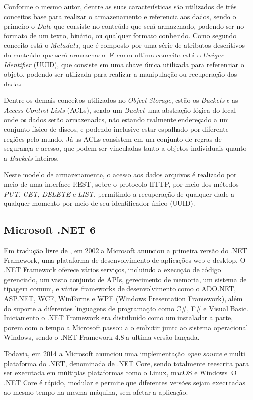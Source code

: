 Conforme o mesmo autor, dentre as suas características são utilizados de três
conceitos base para realizar o armazenamento e referencia aos dados, sendo
o primeiro o \emph{Data} que consiste no conteúdo que será armazenado,
podendo ser no formato de um texto, binário, ou qualquer formato conhecido.
Como segundo conceito está o \emph{Metadata}, que é composto por uma série de
atributos descritivos do conteúdo que será armazenado. E como ultimo conceito está
o \emph{Unique Identifier} (UUID), que consiste em uma chave única utilizada
para referenciar o objeto, podendo ser utilizada para realizar a manipulação ou
recuperação dos dados.

Dentre os demais conceitos utilizados no \emph{Object Storage}, estão os
\emph{Buckets} e as \emph{Access Control Lists} (ACLs), sendo um \emph{Bucket}
uma abstração lógica do local onde os dados serão armazenados, não estando
realmente endereçado a um conjunto físico de discos, e podendo inclusive
estar espalhado por diferente regiões pelo mundo. Já as ACLs consistem em
um conjunto de regras de segurança e acesso, que podem ser vinculadas
tanto a objetos individuais quanto a \emph{Buckets} inteiros.

Neste modelo de armazenamento, o acesso aos dados arquivos é realizado por meio
de uma interface REST, sobre o protocolo HTTP, por meio dos métodos \emph{PUT},
\emph{GET}, \emph{DELETE} e \emph{LIST}, permitindo a recuperação de qualquer
dado a qualquer momento por meio de seu identificador único (UUID).

\subsection{Microsoft .NET 6}

Em tradução livre de \cite{Akella:2022}, em 2002 a Microsoft anunciou a primeira
versão do .NET Framework, uma plataforma de desenvolvimento de aplicações
web e desktop. O .NET Framework oferece vários serviços, incluindo a
execução de código gerenciado, um vasto conjunto de APIs, gerecimento
de memoria, um sistema de tipagem comum, e vários frameworks de desenvolvimento
como o ADO.NET, ASP.NET, WCF, WinForms e WPF (Windows Presentation Framework),
além do suporte a diferentes linguagens de programação como C\#, F\# e Visual Basic.
Iniciamento o .NET Framework era distribuído como um instalador a parte, porem
com o tempo a Microsoft passou a o embutir junto ao sistema operacional Windows,
sendo o .NET Framework 4.8 a ultima versão lançada.

Todavia, em 2014 a Microsoft anunciou uma implementação \emph{open source} e
multi plataforma do .NET, denominada de .NET Core, sendo totalmente reescrita
para ser executada em múltiplas plataformas como o Linux, macOS e Windows.
O .NET Core é rápido, modular e permite que diferentes versões sejam
executadas ao mesmo tempo na mesma máquina, sem afetar a aplicação.


